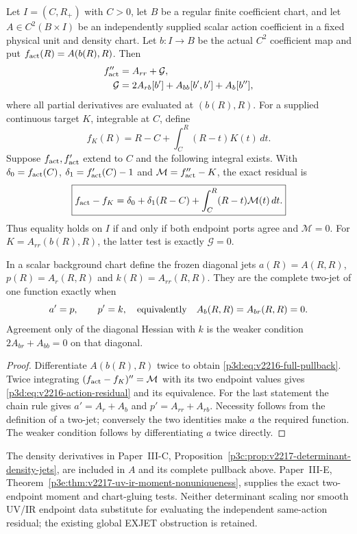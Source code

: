 \documentclass[12pt,a4paper]{article}
\begin{document}
\begin{theorem}
\label{p3d:thm:v2216-complete-action-jets}
Let $I=(C,R_+)$ with $C>0$, let $B$ be a regular finite coefficient chart,
and let $A\in C^2(B\times I)$ be an independently supplied scalar action
coefficient in a fixed physical unit and density chart. Let $b:I\to B$ be
the actual $C^2$ coefficient map and put
$f_{\rm act}(R)=A(b(R),R)$. Then
\begin{align}
 f_{\rm act}''&=A_{rr}+\mathcal G,\notag\\
 \mathcal G&=2A_{rb}[b']+A_{bb}[b',b']+A_b[b''],
 \label{p3d:eq:v2216-full-pullback}
\end{align}
where all partial derivatives are evaluated at $(b(R),R)$.
For a supplied continuous target $K$, integrable at $C$, define
\[
 f_K(R)=R-C+\int_C^R(R-t)K(t)\,dt.
\]
Suppose $f_{\rm act},f_{\rm act}'$ extend to $C$ and the following
integral exists. With
$\delta_0=f_{\rm act}(C)$, $\delta_1=f_{\rm act}'(C)-1$ and
$\mathcal M=f_{\rm act}''-K$, the exact residual is
\begin{equation}
 \boxed{f_{\rm act}-f_K=\delta_0+\delta_1(R-C)+
          \int_C^R(R-t)\mathcal M(t)\,dt.}
 \label{p3d:eq:v2216-action-residual}
\end{equation}
Thus equality holds on $I$ if and only if both endpoint ports agree and
$\mathcal M=0$. For $K=A_{rr}(b(R),R)$, the latter test is exactly
$\mathcal G=0$.

In a scalar background chart define the frozen diagonal jets
$a(R)=A(R,R)$, $p(R)=A_r(R,R)$ and $k(R)=A_{rr}(R,R)$. They are the
complete two-jet of one function exactly when
\[
 a'=p,\qquad p'=k,
 \quad\hbox{equivalently}\quad A_b(R,R)=A_{br}(R,R)=0.
\]
Agreement only of the diagonal Hessian with $k$ is the weaker condition
$2A_{br}+A_{bb}=0$ on that diagonal.
\end{theorem}
\begin{proof}
Differentiate $A(b(R),R)$ twice to obtain
\eqref{p3d:eq:v2216-full-pullback}. Twice integrating
$(f_{\rm act}-f_K)''=\mathcal M$ with its two endpoint values gives
\eqref{p3d:eq:v2216-action-residual} and its equivalence. For the last
statement the chain rule gives $a'=A_r+A_b$ and
$p'=A_{rr}+A_{rb}$. Necessity follows from the definition of a two-jet;
conversely the two identities make $a$ the required function. The weaker
condition follows by differentiating $a$ twice directly.
\end{proof}

\begin{remark}
\label{p3d:rem:v2217-density-matching-import}
The density derivatives in Paper~III-C,
Proposition~\ref{p3c:prop:v2217-determinant-density-jets}, are included in
$A$ and its complete pullback above. Paper~III-E,
Theorem~\ref{p3e:thm:v2217-uv-ir-moment-nonuniqueness}, supplies the exact
two-endpoint moment and chart-gluing tests. Neither determinant scaling nor
smooth UV/IR endpoint data substitute for evaluating the independent
same-action residual; the existing global EXJET obstruction is retained.
\end{remark}
\end{document}
